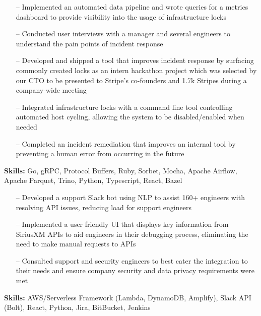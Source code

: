 \documentclass[9pt,a4paper]{altacv}
\begin{document}
\divider


\begin{itemize}
    \setlength{\itemindent}{0.5em}
    \item[--] Implemented an automated data pipeline and wrote queries for a metrics dashboard to provide visibility into the usage of infrastructure locks
    \item[--] Conducted user interviews with a manager and several engineers to understand the pain points of incident response
    \item[--] Developed and shipped a tool that improves incident response by surfacing commonly created locks as an intern hackathon project which was selected by our CTO to be presented to Stripe's co-founders and 1.7k Stripes during a company-wide meeting
    \item[--] Integrated infrastructure locks with a command line tool controlling automated host cycling, allowing the system to be disabled/enabled when needed
    \item[--] Completed an incident remediation that improves an internal tool by preventing a human error from occurring in the future
\end{itemize}
\smallskip
\textbf{Skills:} Go, gRPC, Protocol Buffers, Ruby, Sorbet, Mocha, Apache Airflow, Apache Parquet, Trino, Python, Typescript, React, Bazel

\divider


\begin{itemize}
    \setlength{\itemindent}{0.5em}
    \item[--] Developed a support Slack bot using NLP to assist 160+ engineers with resolving API issues, reducing load for support engineers
    \item[--] Implemented a user friendly UI that displays key information from SiriusXM APIs to aid engineers in their debugging process, eliminating the need to make manual requests to APIs
    \item[--] Consulted support and security engineers to best cater the integration to their needs and ensure company security and data privacy requirements were met
\end{itemize}
\smallskip
\textbf{Skills:} AWS/Serverless Framework (Lambda, DynamoDB, Amplify), Slack API (Bolt), React, Python, Jira, BitBucket, Jenkins
\end{document}
